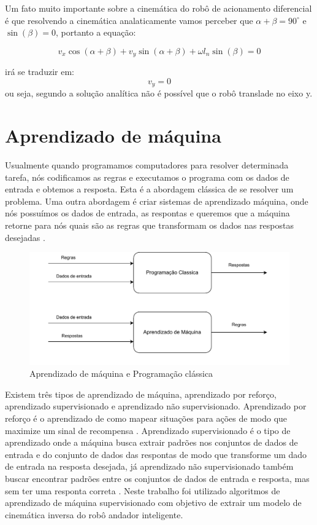Um fato muito importante sobre a cinemática do robô de acionamento diferencial
é que resolvendo a cinemática analaticamente vamos perceber que
$\alpha + \beta = 90^{\circ}$ e $\sin(\beta) = 0$, portanto a equação:

\begin{equation}
    v_x\cos(\alpha + \beta)  + v_y\sin(\alpha + \beta) +  \omega l_n\sin(\beta) = 0
\end{equation}

irá se traduzir em:
\begin{equation}
    v_y = 0
\end{equation}
ou seja, segundo a solução analítica não é possível que
o robô translade no eixo y.

\section{Aprendizado de máquina}
Usualmente quando programamos computadores para
resolver determinada tarefa, nós codificamos as regras e
executamos o programa com os dados de entrada e obtemos a resposta.
Esta é a abordagem clássica de se resolver um problema. Uma outra abordagem
é criar sistemas de aprendizado máquina, onde nós possuímos os
dados de entrada, as respontas e queremos que a máquina retorne
para nós quais são as regras que transformam os dados nas respostas
desejadas \cite{chollet2021deep}.

\begin{figure}[H]
    \centering
    \includegraphics[scale=0.7]{figuras/machine_learning_diagram.pdf}
    \caption{Aprendizado de máquina e Programação clássica}
\end{figure}

Existem três tipos de aprendizado de máquina, aprendizado por reforço,
aprendizado supervisionado e aprendizado não supervisionado.
Aprendizado por reforço é o aprendizado de como mapear situações
para ações de modo que maximize um sinal de recompensa
\cite{sutton2018reinforcement}. Aprendizado supervisionado é o
tipo de aprendizado onde a máquina busca extrair padrões nos conjuntos
de dados de entrada  e do conjunto de dados das respontas de modo que
transforme um dado de entrada na resposta desejada, já aprendizado não
supervisionado também buscar encontrar padrões entre os conjuntos de
dados de entrada e resposta, mas sem ter uma responta correta
\cite{trask2019grokking}. Neste trabalho foi utilizado algoritmos de
aprendizado de máquina supervisionado com objetivo de extrair um modelo de
cinemática inversa do robô andador inteligente.

